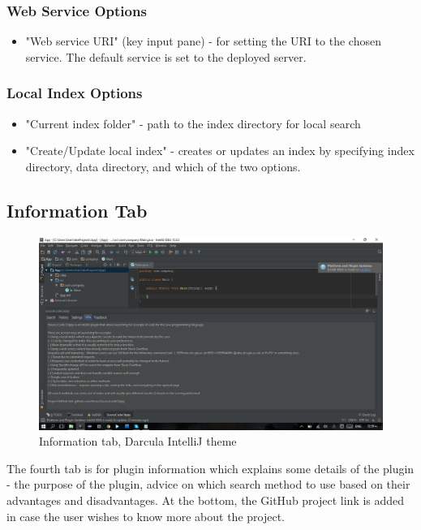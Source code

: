 \documentclass{l4proj}
\begin{document}
\subsubsection{Web Service Options} 
\begin{itemize}
\item "Web service URI" (key input pane) - for setting the URI to the chosen service. The default service is set to the deployed server.
\end{itemize}

\subsubsection{Local Index Options}
\begin{itemize}
\item "Current index folder" - path to the index directory for local search
\item "Create/Update local index" - creates or updates an index by specifying index directory, data directory, and which of the two options.
\end{itemize}


\subsection{Information Tab}

\begin{figure}[H]
\includegraphics[scale=0.5]{tab-info}
\centering
\caption{Information tab, Darcula IntelliJ theme}
\label{fig:info-tab}
\end{figure}

The fourth tab is for plugin information which explains some details of the plugin - the purpose of the plugin, advice on which search method to use based on their advantages and disadvantages. At the bottom, the GitHub project link is added in case the user wishes to know more about the project.
\end{document}
